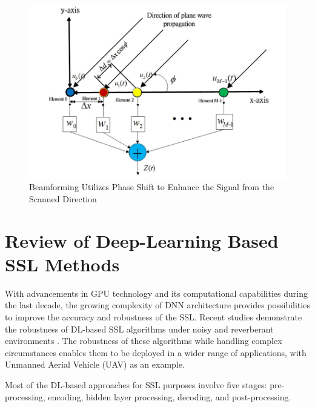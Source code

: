 \begin{figure}[H]
    \centering
    \includegraphics[width=0.4\linewidth]{figures/Explain_beamforming.png}
    \caption{Beamforming Utilizes Phase Shift to Enhance the Signal from the Scanned Direction}
\end{figure}


\section*{Review of Deep-Learning Based SSL Methods}

With advancements in GPU technology and its computational capabilities during the last decade, the growing complexity of DNN architecture provides possibilities to improve the accuracy and robustness of the SSL. Recent studies demonstrate the robustness of DL-based SSL algorithms under noisy and reverberant environments \cite{wang_robust_2018} \cite{zhang_deep_2017} \cite{lee_sound_2020} \cite{ma_exploiting_2017}. The robustness of these algorithms while handling complex circumstances enables them to be deployed in a wider range of applications, with Unmanned Aerial Vehicle (UAV) \cite{wang_deep-learning-assisted_2022} as an example.

Most of the DL-based approaches for SSL purposes involve five stages: pre-processing, encoding, hidden layer processing, decoding, and post-processing.

